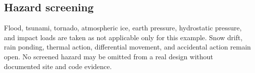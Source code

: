 \subsection{Hazard screening}
Flood, tsunami, tornado, atmospheric ice, earth pressure, hydrostatic pressure, and
impact loads are taken as not applicable only for this example. Snow drift, rain
ponding, thermal action, differential movement, and accidental action remain open.
No screened hazard may be omitted from a real design without documented site and
code evidence.

